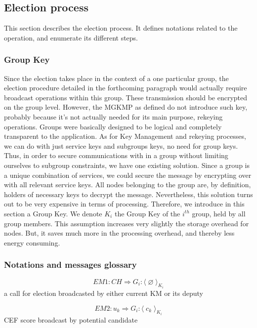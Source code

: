 \subsection{Election process}

This section describes the election process. It defines notations related to the operation, and enumerate its different steps.

\subsubsection{Group Key}

Since the election takes place in the context of a one particular group, the election procedure detailed in the forthcoming paragraph would actually require broadcast operations within this group. These transmission should be encrypted on the group level. However, the MGKMP as defined do not introduce such key, probably because it’s not actually needed for its main purpose, rekeying operations. Groups were basically designed to be logical and completely transparent to the application. As for Key Management and rekeying processes, we can do with just service keys and subgroups keys, no need for group keys. Thus, in order to secure communications with in a group without limiting ourselves to subgroup constraints, we have one existing solution. Since a group is a unique combination  of services, we could secure the message by encrypting over with all relevant service keys. All nodes belonging to the group are, by definition, holders of necessary keys to decrypt the message. Nevertheless, this solution turns out to be very expensive in terms of processing. Therefore, we introduce in this section a Group Key. We denote $K_i$ the Group Key of the $i^{th}$ group, held by all group members. This assumption increases very slightly the storage overhead for nodes. But, it saves much more in the processing overhead, and thereby less energy consuming.

\subsubsection{Notations and messages glossary}

\begin{equation}\label{eq6}
	EM1: CH \Rightarrow G_i : \langle\; \varnothing\; \rangle_{K_i}
\end{equation}
a call for election broadcasted by either current KM or its deputy

\begin{equation}\label{eq7}
	EM2: u_k \Rightarrow G_i : \langle\; c_k\; \rangle_{K_i}
\end{equation}
CEF score broadcast by potential candidate

